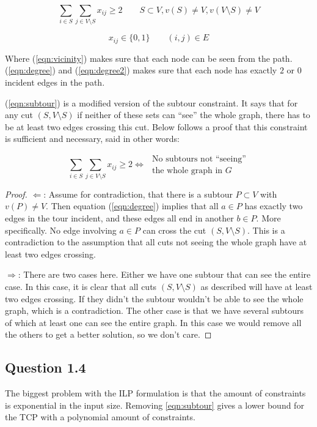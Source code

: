 \documentclass{sig-alternate}
\begin{document}
\begin{equation}
    \label{eqn:subtour}
    \sum_{i \in S} \sum_{j \in V\setminus S} x_{ij} \ge 2
    \qquad S\subset V, v(S) \ne V, v(V\setminus S) \ne V
\end{equation}

\begin{equation}
    x_{ij} \in \{0,1\}
    \qquad (i,j) \in E
\end{equation}

Where (\ref{eqn:vicinity}) makes sure that each node can be seen from the
path. (\ref{eqn:degree}) and (\ref{eqn:degree2}) makes sure that each node has
exactly $2$ or $0$ incident edges in the path.

(\ref{eqn:subtour}) is a modified version of the subtour constraint. It says
that for any cut $(S, V\setminus S)$ if neither of these sets can ``see'' the
whole graph, there has to be at least two edges crossing this cut. Below
follows a proof that this constraint is sufficient and necessary, said in
other words:

\[
    \sum_{i\in S} \sum_{j\in V\setminus S} x_{ij} \ge 2 \Leftrightarrow
    \begin{matrix} \text{ No subtours not ``seeing''} \\
                   \text{ the whole graph in $G$} \end{matrix}
\]

\begin{proof}
$\Leftarrow$: Assume for contradiction, that there is a subtour $P\subset V$
with $v(P)\ne V$. Then equation (\ref{eqn:degree}) implies that all $a\in P$
has exactly two edges in the tour incident, and these edges all end in another
$b\in P$. More specifically. No edge involving $a\in P$ can cross the cut
$(S, V\setminus S)$. This is a contradiction to the assumption that all cuts
not seeing the whole graph have at least two edges crossing.

$\Rightarrow$: There are two cases here. Either we have one subtour that can
see the entire case. In this case, it is clear that all cuts
$(S, V\setminus S)$ as described will have at least two edges crossing. If
they didn't the subtour wouldn't be able to see the whole graph, which is a
contradiction. The other case is that we have several subtours of which
at least one can see the entire graph. In this case we would remove all the
others to get a better solution, so we don't care.
\end{proof}

\subsection*{Question 1.4}
The biggest problem with the ILP formulation is that the amount of constraints
is exponential in the input size. Removing \autoref{eqn:subtour} gives a lower
bound for the TCP with a polynomial amount of constraints.
\end{document}
